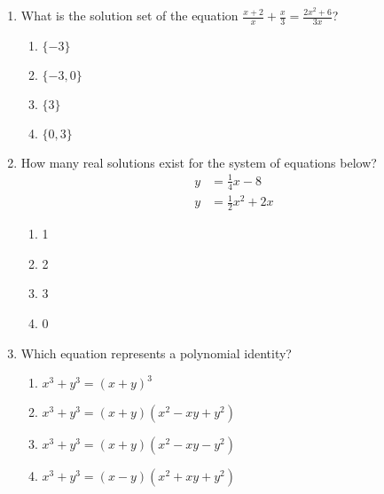 \documentclass[12pt, twoside]{article}
\begin{document}
\begin{enumerate}[itemsep=0.5cm]
\item What is the solution set of the equation \(\displaystyle \frac{x+2}{x} + \frac{x}{3} = \frac{2x^2+6}{3x}\)?
\begin{enumerate}
    \item \(\{-3\}\)
    \item \(\{-3, 0\}\)
    \item \(\{3\}\)
    \item \(\{0, 3\}\)
\end{enumerate}

\item How many real solutions exist for the system of equations below?
\begin{align*}
    y &= \frac{1}{4} x - 8 \\
    y &= \frac{1}{2} x^2 + 2x
\end{align*}
\begin{enumerate}
    \item 1
    \item 2
    \item 3
    \item 0
\end{enumerate}

\item Which equation represents a polynomial identity?
\begin{enumerate}
    \item \(x^3 + y^3 = (x + y)^3\)
    \item \(x^3 + y^3 = (x + y)(x^2 - xy + y^2)\)
    \item \(x^3 + y^3 = (x + y)(x^2 - xy - y^2)\)
    \item \(x^3 + y^3 = (x - y)(x^2 + xy + y^2)\)
\end{enumerate}


\end{enumerate}
\end{document}

